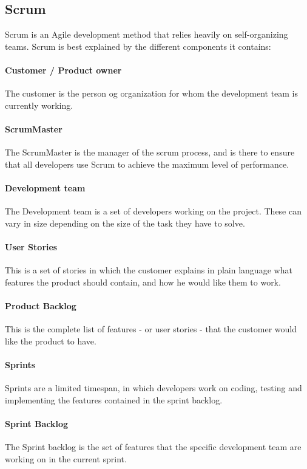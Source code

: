 \subsection{Scrum}
Scrum is an Agile development method that relies heavily on self-organizing teams. Scrum is best explained by the different components it contains:


\paragraph{Customer / Product owner}
The customer is the person og organization for whom the development team is currently working.

\paragraph{ScrumMaster}
The ScrumMaster is the manager of the scrum process, and is there to ensure that all developers use Scrum to achieve the maximum level of performance.

\paragraph{Development team}
The Development team is a set of developers working on the project. These can vary in size depending on the size of the task they have to solve.

\paragraph{User Stories}
This is a set of stories in which the customer explains in plain language what features the product should contain, and how he would like them to work.

\paragraph{Product Backlog}
This is the complete list of features - or user stories - that the customer would like the product to have.

\paragraph{Sprints}
Sprints are a limited timespan, in which developers work on coding, testing and implementing the features contained in the sprint backlog.

\paragraph{Sprint Backlog}
The Sprint backlog is the set of features that the specific development team are working on in the current sprint.

